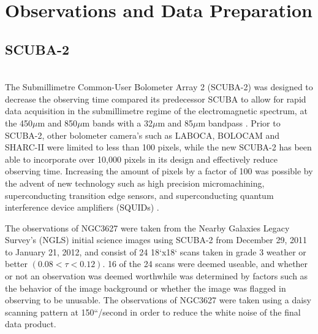 \chapter{Observations and Data Preparation}\label{observations}

\section{SCUBA-2} \\
The Submillimetre Common-User Bolometer Array 2 (SCUBA-2) was designed to decrease the observing time compared its predecessor SCUBA to allow for rapid data acquisition in the submillimetre regime of the electromagnetic spectrum, at the 450$\mu$m and 850$\mu$m bands with a 32$\mu$m and 85$\mu$m bandpass \citet{holland2013}.  Prior to SCUBA-2, other bolometer camera's such as LABOCA, BOLOCAM and SHARC-II were limited to less than 100 pixels, while the new SCUBA-2 has been able to incorporate over 10,000 pixels in its design and effectively reduce observing time.  Increasing the amount of pixels by a factor of 100 was possible by the advent of new technology such as high precision micromachining, superconducting transition edge sensors, and superconducting quantum interference device amplifiers (SQUIDs) \citet{holland2013}.

The observations of NGC3627 were taken from the Nearby Galaxies Legacy Survey's (NGLS) initial science images using SCUBA-2 from December 29, 2011  to January 21, 2012, and consist of 24 18`x18` scans taken in grade 3 weather or better $(0.08 < \tau <0.12)$.  16 of the 24 scans were deemed useable, and whether or not an observation was deemed worthwhile was determined by factors such as the behavior of the image background or whether the image was flagged in observing to be unusable.  The observations of NGC3627 were taken using a daisy scanning pattern at 150``/second in order to reduce the white noise of the final data product. 

